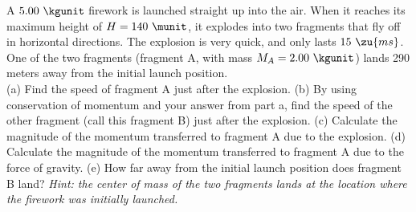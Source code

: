 A $5.00\ \kgunit$ firework is launched straight up into the air. When
it reaches its maximum height of $H = 140\ \munit$, it explodes into two
fragments that fly off in horizontal directions. The explosion is
very quick, and only lasts $15\ \zu{ms}$. One of the two fragments
(fragment A, with mass $M_A = 2.00\ \kgunit$) lands 290 meters away from
the initial launch position.\\
%
(a) Find the speed of fragment A just after the
explosion.\answercheck\hwendpart
%
(b) By using conservation of momentum and your answer from part a,
find the speed of the other fragment (call this fragment B) just
after the explosion.\answercheck\hwendpart
%
(c) Calculate the magnitude of the momentum transferred to fragment A
due to the explosion.\answercheck\hwendpart
%
(d) Calculate the magnitude of the momentum transferred to fragment A
due to the force of gravity.\answercheck\hwendpart
%
(e) How far away from the initial launch position does fragment B
land? \emph{Hint: the center of mass of the two fragments lands at
the location where the firework was initially launched.}\answercheck
